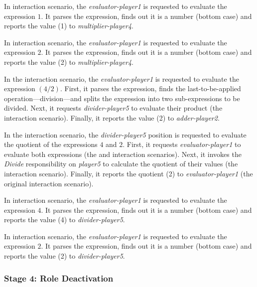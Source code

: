 In {} interaction scenario, the \textit{evaluator-player1} is requested to evaluate the expression $1$.
It parses the expression, finds out it is a number (bottom case) and reports the value (1) to \textit{multiplier-player4}.

In {} interaction scenario, the \textit{evaluator-player1} is requested to evaluate the expression $2$.
It parses the expression, finds out it is a number (bottom case) and reports the value (2) to \textit{multiplier-player4}.

In the {} interaction scenario, the \textit{evaluator-player1} is requested to evaluate the expression $(4/2)$.
First, it parses the expression, finds the last-to-be-applied operation---division---and splits the expression into two sub-expressions to be divided.
Next, it requests \textit{divider-player5} to evaluate their product (the {} interaction scenario).
Finally, it reports the value (2) to \textit{adder-player2}.

In the {} interaction scenario, the \textit{divider-player5} position is requested to evaluate the quotient of the expressions $4$ and $2$.
First, it requests \textit{evaluator-player1} to evaluate both expressions (the {} and {} interaction scenarios).
Next, it invokes the \textit{Divide} responsibility on \textit{player5} to calculate the quotient of their values (the {} interaction scenario).
Finally, it reports the quotient (2) to \textit{evaluator-player1} (the original {} interaction scenario).

In {} interaction scenario, the \textit{evaluator-player1} is requested to evaluate the expression $4$.
It parses the expression, finds out it is a number (bottom case) and reports the value (4) to \textit{divider-player5}.

In {} interaction scenario, the \textit{evaluator-player1} is requested to evaluate the expression $2$.
It parses the expression, finds out it is a number (bottom case) and reports the value (2) to \textit{divider-player5}.

\subsubsection*{Stage 4: Role Deactivation}

